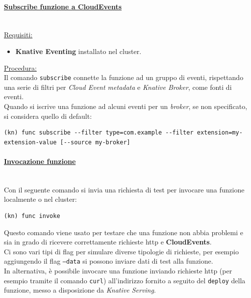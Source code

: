 \documentclass[12pt,a4paper,openany,twoside]{book}
\begin{document}
\paragraph{\underline{Subscribe funzione a CloudEvents}} ~\\
\underline{Requisiti:}
\begin{itemize}
    \item \textbf{Knative Eventing} installato nel cluster.
\end{itemize}

\noindent
\underline{Procedura:}
\\
Il comando \texttt{subscribe} connette la funzione ad un gruppo di eventi, rispettando una serie di filtri per \textit{Cloud Event metadata} e \textit{Knative Broker}, come fonti di eventi.
\\
Quando si iscrive una funzione ad alcuni eventi per un \textit{broker}, se non specificato, si considera quello di default:
\begin{lstlisting}
(kn) func subscribe --filter type=com.example --filter extension=my-extension-value [--source my-broker]\end{lstlisting}

\paragraph{\underline{Invocazione funzione}} ~\\
Con il seguente comando si invia una richiesta di test per invocare una funzione localmente o nel cluster: \begin{lstlisting}
(kn) func invoke\end{lstlisting}

\noindent
Questo comando viene usato per testare che una funzione non abbia problemi e sia in grado di ricevere correttamente richieste \ac{http} e \textbf{CloudEvents}.
\\
Ci sono vari tipi di flag per simulare diverse tipologie di richieste, per esempio aggiungendo il flag \texttt{--data} si possono inviare dati di test alla funzione.
\\
In alternativa, è possibile invocare una funzione inviando richieste \ac{http} (per esempio tramite il comando \texttt{curl}) all'indirizzo fornito a seguito del \texttt{deploy} della funzione, messo a disposizione da \textit{Knative Serving}.

\end{document}
